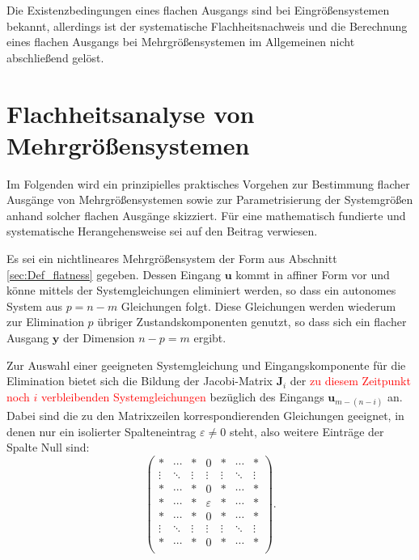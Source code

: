 Die Existenzbedingungen eines ﬂachen Ausgangs sind bei Eingrößensystemen bekannt, allerdings ist der systematische Flachheitsnachweis und die Berechnung eines
ﬂachen Ausgangs bei Mehrgrößensystemen im Allgemeinen nicht abschließend gelöst. \cite[S. 185]{NLRT_Roebenack}

\section{Flachheitsanalyse von Mehrgrößensystemen}

Im Folgenden wird ein prinzipielles praktisches Vorgehen zur Bestimmung flacher Ausgänge von Mehrgrößensystemen sowie zur Parametrisierung der Systemgrößen anhand solcher flachen Ausgänge skizziert. Für eine mathematisch fundierte und systematische Herangehensweise sei auf den Beitrag \cite{Fritzsche2016} verwiesen.

Es sei ein nichtlineares Mehrgrößensystem der Form aus Abschnitt \ref{sec:Def_flatness} gegeben. Dessen Eingang $\mathbf{u}$ kommt in affiner Form vor und könne mittels der Systemgleichungen eliminiert werden, so dass ein autonomes System aus $p = n - m$ Gleichungen folgt. Diese Gleichungen werden wiederum zur Elimination $p$ übriger Zustandskomponenten genutzt, so dass sich ein flacher Ausgang $\mathbf{y}$ der Dimension $n - p = m$ ergibt. 

Zur Auswahl einer geeigneten Systemgleichung und Eingangskomponente für die Elimination bietet sich die Bildung der Jacobi-Matrix $\mathbf{J}_i$ der  \textcolor{red}{zu diesem Zeitpunkt noch $i$ verbleibenden Systemgleichungen} bezüglich des Eingangs $\mathbf{u}_{m-(n-i)}$ an. Dabei sind die zu den Matrixzeilen korrespondierenden Gleichungen geeignet, in denen nur ein isolierter Spalteneintrag $\varepsilon \neq 0$ steht, also weitere Einträge der Spalte Null sind:
\begin{equation}
	\begin{pmatrix}
	* & \cdots & * & 0 & * & \cdots & *\\
	\vdots & \ddots & \vdots & \vdots & \vdots & \ddots & \vdots \\
	* & \cdots & * & 0 & * & \cdots & *  \\
	* & \cdots & * & \varepsilon & * & \cdots & * \\
	* & \cdots & * & 0 & * & \cdots & *  \\
	\vdots & \ddots & \vdots & \vdots & \vdots & \ddots & \vdots \\
	* & \cdots & * & 0 & * & \cdots & *\\
	\end{pmatrix}.
\end{equation}

